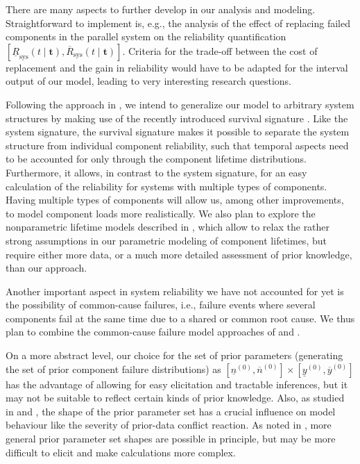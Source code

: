 \documentclass[12pt,a4paper,twocolumn,fleqn]{narms}
\renewcommand{\vec}[1]{{\bm#1}}
\newcommand{\uz}{^{(0)}} %
\newcommand{\ul}[1]{\underline{#1}}
\newcommand{\ol}[1]{\overline{#1}}
\newcommand{\lRsys}{\ul{R}_\text{sys}}
\newcommand{\uRsys}{\ol{R}_\text{sys}}
\def\yzl{\ul{y}\uz}
\def\yzu{\ol{y}\uz}
\def\nzl{\ul{n}\uz}
\def\nzu{\ol{n}\uz}
\newcommand{\comments}[1]{{\small\color{gray} #1}}
\begin{document}
There are many aspects to further develop in our analysis and modeling.
Straightforward to implement is, e.g., the analysis of the effect of replacing failed components
in the parallel system on the reliability quantification $[\lRsys(t \mid \vec{t}), \uRsys(t \mid \vec{t})]$.
Criteria for the trade-off between the cost of replacement and the gain in reliability
would have to be adapted for the interval output of our model,
leading to very interesting research questions.

Following the approach in ,
we intend to generalize our model to arbitrary system structures
by making use of the recently introduced survival signature \cite{2012:survsign}.
Like the system signature, the survival signature makes it possible to separate the system structure
from individual component reliability, such that temporal aspects need to be accounted for
only through the component lifetime distributions.
Furthermore, it allows, in contrast to the system signature,
for an easy calculation of the reliability for systems with multiple types of components.
Having multiple types of components will allow us, among other improvements,
to model component loads more realistically.
%
We also plan to explore the nonparametric lifetime models
described in ,
which allow to relax the rather strong assumptions in our parametric modeling of component lifetimes,
but require either more data, or a much more detailed assessment of prior knowledge, than our approach.

Another important aspect in system reliability we have not accounted for yet
is the possibility of common-cause failures,
i.e., failure events where several components fail at the same time due to a shared or common root cause.
We thus plan to combine the common-cause failure model approaches
of  and .

On a more abstract level, our choice for the set of prior parameters
(generating the set of prior component failure distributions) as $[\nzl, \nzu] \times [\yzl, \yzu]$
has the advantage of allowing for easy elicitation and tractable inferences,
but it may not be suitable to reflect certain kinds of prior knowledge.
Also, as studied in \cite{Walter2011a} and \cite[\S 3.1]{diss},
the shape of the prior parameter set has a crucial influence on model behaviour
like the severity of prior-data conflict reaction.
As noted in \cite[pp.~66f]{diss},
more general prior parameter set shapes are possible in principle,
but may be more difficult to elicit and make calculations more complex.




\end{document}
